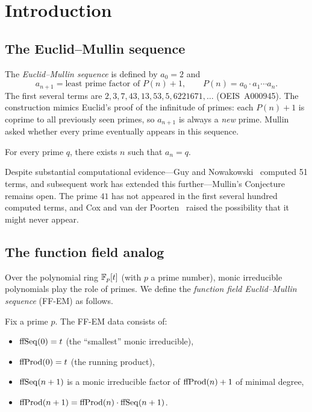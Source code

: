\section{Introduction}\label{sec:intro}

\subsection{The Euclid--Mullin sequence}

The \emph{Euclid--Mullin sequence} is defined by $a_0 = 2$ and
\[
  a_{n+1} = \text{least prime factor of } P(n) + 1,
  \qquad P(n) = a_0 \cdot a_1 \cdots a_n.
\]
The first several terms are $2, 3, 7, 43, 13, 53, 5, 6221671, \ldots$
(OEIS~A000945). The construction mimics Euclid's proof of the infinitude of
primes: each $P(n)+1$ is coprime to all previously seen primes, so
$a_{n+1}$ is always a \emph{new} prime. Mullin~\cite{Mullin63} asked
whether every prime eventually appears in this sequence.

\begin{openproblem}
For every prime $q$, there exists $n$ such that $a_n = q$.
\end{openproblem}

Despite substantial computational evidence---Guy and Nowakowski~\cite{GuyNow75}
computed 51 terms, and subsequent work has extended this further---Mullin's
Conjecture remains open. The prime $41$ has not appeared in the first several
hundred computed terms, and Cox and van der Poorten~\cite{CoxVdP} raised the
possibility that it might never appear.

\subsection{The function field analog}

Over the polynomial ring $\mathbb{F}_p[t]$ (with $p$ a prime number), monic irreducible
polynomials play the role of primes. We define the \emph{function field
Euclid--Mullin sequence} (FF-EM) as follows.

\begin{definition}[FF-EM Sequence]\label{def:ffem}
Fix a prime $p$. The FF-EM data consists of:
\begin{itemize}
  \item $\mathrm{ffSeq}(0) = t$ (the ``smallest'' monic irreducible),
  \item $\mathrm{ffProd}(0) = t$ (the running product),
  \item $\mathrm{ffSeq}(n+1)$ is a monic irreducible factor of $\mathrm{ffProd}(n)+1$ of
    minimal degree,
  \item $\mathrm{ffProd}(n+1) = \mathrm{ffProd}(n) \cdot \mathrm{ffSeq}(n+1)$.
\end{itemize}
\end{definition}

